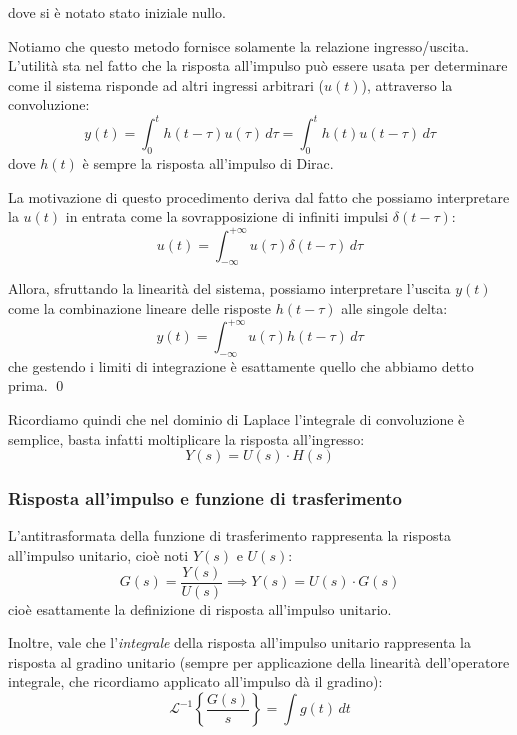 \documentclass[a4paper,11pt]{article}
\begin{document}
\begin{center}
\end{center}
dove si è notato stato iniziale nullo.

Notiamo che questo metodo fornisce solamente la relazione ingresso/uscita.
L'utilità sta nel fatto che la risposta all'impulso può essere usata per determinare come il sistema risponde ad altri ingressi arbitrari ($u(t)$), attraverso la convoluzione:
$$
y(t) =\int_0^t h(t - \tau) u(\tau) \, d\tau = \int_0^t h(t) u(t - \tau) \, d\tau
$$
dove $h(t)$ è sempre la risposta all'impulso di Dirac.

La motivazione di questo procedimento deriva dal fatto che possiamo interpretare la $u(t)$ in entrata come la sovrapposizione di infiniti impulsi $\delta (t - \tau)$:
$$
u(t) = \int_{-\infty}^{+\infty} u(\tau) \delta(t - \tau) \, d\tau
$$

Allora, sfruttando la linearità del sistema, possiamo interpretare l'uscita $y(t)$ come la combinazione lineare delle risposte $h(t - \tau)$ alle singole delta:
$$
y(t) = \int_{-\infty}^{+\infty} u(\tau) h(t - \tau) \, d\tau
$$
che gestendo i limiti di integrazione è esattamente quello che abbiamo detto prima. \qed

\par\smallskip

Ricordiamo quindi che nel dominio di Laplace l'integrale di convoluzione è semplice, basta infatti moltiplicare la risposta all'ingresso:
$$
Y(s) = U(s) \cdot H(s)
$$

\subsubsection{Risposta all'impulso e funzione di trasferimento}
L'antitrasformata della funzione di trasferimento rappresenta la risposta all'impulso unitario, cioè noti $Y(s)$ e $U(s)$:
$$
G(s) = \frac{Y(s)}{U(s)} \implies Y(s) = U(s) \cdot G(s)
$$
cioè esattamente la definizione di risposta all'impulso unitario.

Inoltre, vale che l'\textit{integrale} della risposta all'impulso unitario rappresenta la risposta al gradino unitario (sempre per applicazione della linearità dell'operatore integrale, che ricordiamo applicato all'impulso dà il gradino):
$$
\mathcal{L}^{-1} \left\{ \frac{G(s)}{s} \right\} = \int g(t) \, dt
$$
\end{document}
